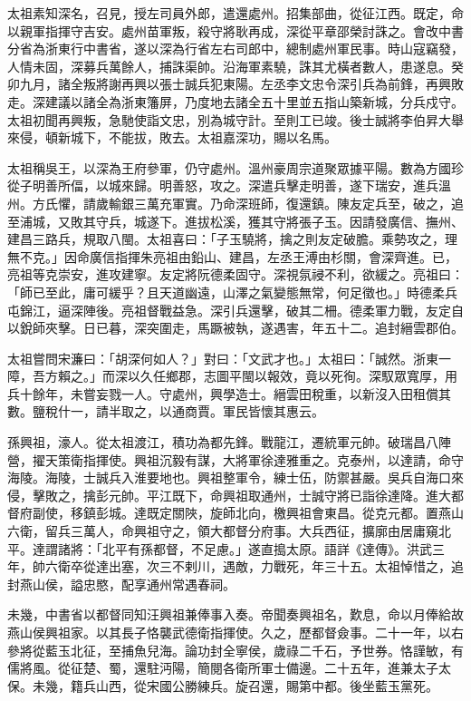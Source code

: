\begin{pinyinscope}
太祖素知深名，召見，授左司員外郎，遣還處州。招集部曲，從征江西。既定，命以親軍指揮守吉安。處州苗軍叛，殺守將耿再成，深從平章邵榮討誅之。會改中書分省為浙東行中書省，遂以深為行省左右司郎中，總制處州軍民事。時山寇竊發，人情未固，深募兵萬餘人，捕誅渠帥。沿海軍素驍，誅其尤橫者數人，患遂息。癸卯九月，諸全叛將謝再興以張士誠兵犯東陽。左丞李文忠令深引兵為前鋒，再興敗走。深建議以諸全為浙東籓屏，乃度地去諸全五十里並五指山築新城，分兵戍守。太祖初聞再興叛，急馳使詣文忠，別為城守計。至則工已竣。後士誠將李伯昇大舉來侵，頓新城下，不能拔，敗去。太祖嘉深功，賜以名馬。

太祖稱吳王，以深為王府參軍，仍守處州。溫州豪周宗道聚眾據平陽。數為方國珍從子明善所偪，以城來歸。明善怒，攻之。深遣兵擊走明善，遂下瑞安，進兵溫州。方氏懼，請歲輸銀三萬充軍實。乃命深班師，復還鎮。陳友定兵至，破之，追至浦城，又敗其守兵，城遂下。進拔松溪，獲其守將張子玉。因請發廣信、撫州、建昌三路兵，規取八閩。太祖喜曰：「子玉驍將，擒之則友定破膽。乘勢攻之，理無不克。」因命廣信指揮朱亮祖由鉛山、建昌，左丞王溥由杉關，會深齊進。已，亮祖等克崇安，進攻建寧。友定將阮德柔固守。深視氛祲不利，欲緩之。亮祖曰：「師已至此，庸可緩乎？且天道幽遠，山澤之氣變態無常，何足徵也。」時德柔兵屯錦江，逼深陣後。亮祖督戰益急。深引兵還擊，破其二柵。德柔軍力戰，友定自以銳師夾擊。日已暮，深突圍走，馬蹶被執，遂遇害，年五十二。追封縉雲郡伯。

太祖嘗問宋濂曰：「胡深何如人？」對曰：「文武才也。」太祖曰：「誠然。浙東一障，吾方賴之。」而深以久任鄉郡，志圖平閩以報效，竟以死徇。深馭眾寬厚，用兵十餘年，未嘗妄戮一人。守處州，興學造士。縉雲田稅重，以新沒入田租償其數。鹽稅什一，請半取之，以通商賈。軍民皆懷其惠云。

孫興祖，濠人。從太祖渡江，積功為都先鋒。戰龍江，遷統軍元帥。破瑞昌八陣營，擢天策衛指揮使。興祖沉毅有謀，大將軍徐達雅重之。克泰州，以達請，命守海陵。海陵，士誠兵入淮要地也。興祖整軍令，練士伍，防禦甚嚴。吳兵自海口來侵，擊敗之，擒彭元帥。平江既下，命興祖取通州，士誠守將已詣徐達降。進大都督府副使，移鎮彭城。達既定關陜，旋師北向，檄興祖會東昌。從克元都。置燕山六衛，留兵三萬人，命興祖守之，領大都督分府事。大兵西征，擴廓由居庸窺北平。達謂諸將：「北平有孫都督，不足慮。」遂直搗太原。語詳《達傳》。洪武三年，帥六衛卒從達出塞，次三不剌川，遇敵，力戰死，年三十五。太祖悼惜之，追封燕山侯，謚忠愍，配享通州常遇春祠。

未幾，中書省以都督同知汪興祖兼俸事入奏。帝聞奏興祖名，歎息，命以月俸給故燕山侯興祖家。以其長子恪襲武德衛指揮使。久之，歷都督僉事。二十一年，以右參將從藍玉北征，至捕魚兒海。論功封全寧侯，歲祿二千石，予世券。恪謹敏，有儒將風。從征楚、蜀，還駐沔陽，簡閱各衛所軍士備邊。二十五年，進兼太子太保。未幾，籍兵山西，從宋國公勝練兵。旋召還，賜第中都。後坐藍玉黨死。


\end{pinyinscope}
